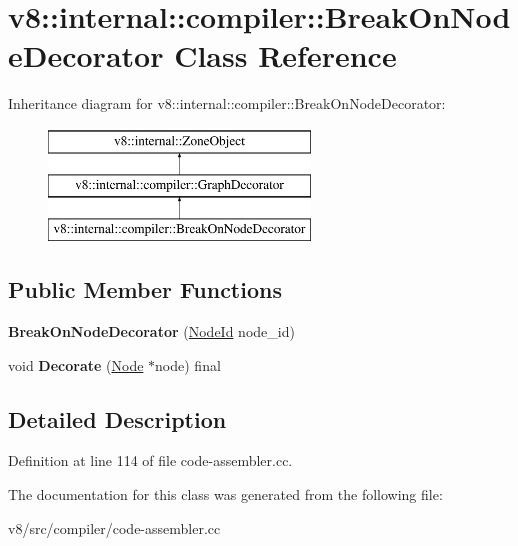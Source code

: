 \hypertarget{classv8_1_1internal_1_1compiler_1_1BreakOnNodeDecorator}{}\section{v8\+:\+:internal\+:\+:compiler\+:\+:Break\+On\+Node\+Decorator Class Reference}
\label{classv8_1_1internal_1_1compiler_1_1BreakOnNodeDecorator}
Inheritance diagram for v8\+:\+:internal\+:\+:compiler\+:\+:Break\+On\+Node\+Decorator\+:\begin{figure}[H]
\begin{center}
\leavevmode
\includegraphics[height=3.000000cm]{classv8_1_1internal_1_1compiler_1_1BreakOnNodeDecorator}
\end{center}
\end{figure}
\subsection*{Public Member Functions}
\begin{DoxyCompactItemize}
\item 
\mbox{\label{classv8_1_1internal_1_1compiler_1_1BreakOnNodeDecorator_a9dd0d957ea387ec0317c950902c3e9a4}} 
{\bfseries Break\+On\+Node\+Decorator} (\mbox{\hyperlink{classuint32__t}{Node\+Id}} node\+\_\+id)
\item 
\mbox{\label{classv8_1_1internal_1_1compiler_1_1BreakOnNodeDecorator_a59940cb3a85a184472d216d9864d6c63}} 
void {\bfseries Decorate} (\mbox{\hyperlink{classv8_1_1internal_1_1compiler_1_1Node}{Node}} $\ast$node) final
\end{DoxyCompactItemize}


\subsection{Detailed Description}


Definition at line 114 of file code-\/assembler.\+cc.



The documentation for this class was generated from the following file\+:\begin{DoxyCompactItemize}
\item 
v8/src/compiler/code-\/assembler.\+cc\end{DoxyCompactItemize}
